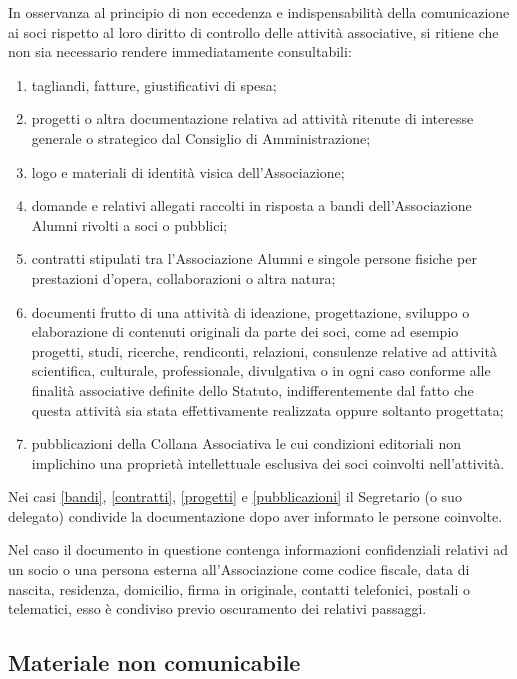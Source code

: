 In osservanza al principio di non eccedenza e indispensabilità della comunicazione ai soci rispetto al loro diritto di controllo delle attività associative, si ritiene che non sia necessario rendere immediatamente consultabili:
\begin{enumerate}
    \item tagliandi, fatture, giustificativi di spesa;
    \item progetti o altra documentazione relativa ad attività ritenute di interesse generale o strategico dal Consiglio di Amministrazione; 
    \item logo e materiali di identità visica dell’Associazione; 
    \item domande e relativi allegati raccolti in risposta a bandi dell’Associazione Alumni rivolti a soci o pubblici; \label{bandi} 
    \item contratti stipulati tra l’Associazione Alumni e singole persone fisiche per prestazioni d’opera, collaborazioni o altra natura; \label{contratti} 
    \item documenti frutto di una attività di ideazione, progettazione,
        sviluppo o elaborazione di contenuti originali da parte dei soci,
        come ad esempio progetti, studi, ricerche, rendiconti, relazioni,
        consulenze relative ad attività scientifica, culturale,
        professionale, divulgativa o in ogni caso conforme alle finalità
        associative definite dello Statuto, indifferentemente dal fatto che
        questa attività sia stata effettivamente realizzata oppure soltanto
        progettata; \label{progetti} 
    \item pubblicazioni della Collana Associativa le cui condizioni editoriali non implichino una proprietà intellettuale esclusiva dei soci coinvolti nell’attività. \label{pubblicazioni} 
\end{enumerate}
Nei casi \ref{bandi}, \ref{contratti}, \ref{progetti} e \ref{pubblicazioni} il
Segretario (o suo delegato) condivide la documentazione dopo aver informato
le persone coinvolte. 

Nel caso il documento in questione contenga informazioni confidenziali
relativi ad un socio o una persona esterna all’Associazione come codice
fiscale, data di nascita, residenza, domicilio, firma in originale, contatti
telefonici, postali o telematici, esso è condiviso previo oscuramento dei
relativi passaggi.

\subsection{Materiale non comunicabile}\label{materiale-non-comunicabile}


